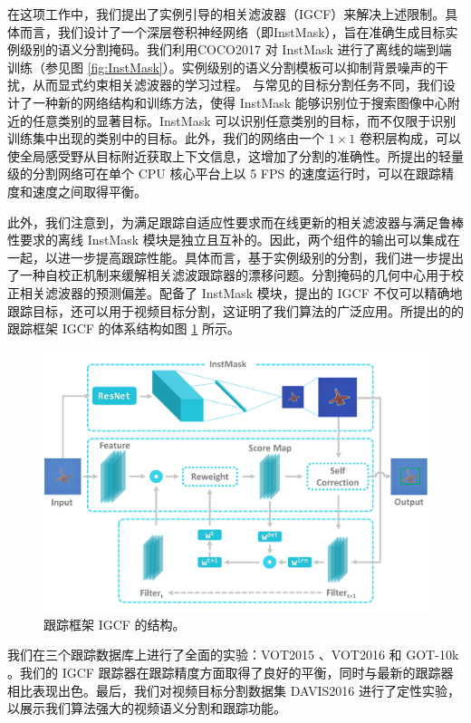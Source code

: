 在这项工作中，我们提出了实例引导的相关滤波器（IGCF）来解决上述限制。具体而言，我们设计了一个深层卷积神经网络（即InstMask），旨在准确生成目标实例级别的语义分割掩码。我们利用COCO2017 \cite{COCO} 对 InstMask 进行了离线的端到端训练（参见图 \ref{fig:InstMask}）。实例级别的语义分割模板可以抑制背景噪声的干扰，从而显式约束相关滤波器的学习过程。
与常见的目标分割任务不同，我们设计了一种新的网络结构和训练方法，使得 InstMask 能够识别位于搜索图像中心附近的任意类别的显著目标。InstMask 可以识别任意类别的目标，而不仅限于识别训练集中出现的类别中的目标。此外，我们的网络由一个 $1 \times 1$ 卷积层构成，可以使全局感受野从目标附近获取上下文信息，这增加了分割的准确性。所提出的轻量级的分割网络可在单个 CPU 核心平台上以 5 FPS 的速度运行时，可以在跟踪精度和速度之间取得平衡。

此外，我们注意到，为满足跟踪自适应性要求而在线更新的相关滤波器与满足鲁棒性要求的离线 InstMask 模块是独立且互补的。因此，两个组件的输出可以集成在一起，以进一步提高跟踪性能。具体而言，基于实例级别的分割，我们进一步提出了一种自校正机制来缓解相关滤波跟踪器的漂移问题。分割掩码的几何中心用于校正相关滤波器的预测偏差。配备了 InstMask 模块，提出的 IGCF 不仅可以精确地跟踪目标，还可以用于视频目标分割，这证明了我们算法的广泛应用。所提出的的跟踪框架 IGCF 的体系结构如图 \ref{fig:IGCF} 所示。

\begin{figure}
    \centering
    \includegraphics[width=1.0\textwidth]{Img/IGCF/instmask1.pdf}
    \caption{跟踪框架 IGCF 的结构。}
    \label{fig:IGCF}
\end{figure}

我们在三个跟踪数据库上进行了全面的实验：VOT2015 \cite{Kristan2015TheVO}、VOT2016 \cite{Kristan2016TheVO} 和 GOT-10k \cite{GOT-10k}。我们的 IGCF 跟踪器在跟踪精度方面取得了良好的平衡，同时与最新的跟踪器相比表现出色。最后，我们对视频目标分割数据集 DAVIS2016 \cite{Perazzi2016} 进行了定性实验，以展示我们算法强大的视频语义分割和跟踪功能。

